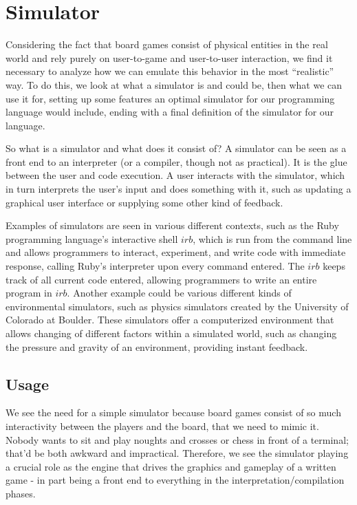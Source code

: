 \section{Simulator}
Considering the fact that board games consist of physical entities
in the real world and rely purely on user-to-game and user-to-user
interaction, we find it necessary to analyze how we can emulate this
behavior in the most ``realistic'' way. To do this, we look at what
a simulator is and could be, then what we can use it for, setting
up some features an optimal simulator for our programming language
would include, ending with a final definition of the simulator for our
language.

So what is a simulator and what does it consist of? A simulator can
be seen as a front end to an interpreter (or a compiler, though not
as practical). It is the glue between the user and code
execution. A user interacts with the simulator, which in turn interprets
the user's input and does something with it, such as updating a
graphical user interface or supplying some other kind of feedback.

Examples of simulators are seen in various different contexts, such
as the Ruby\cite{rubyLang} programming language's interactive shell
$irb$, which is run from the command line and allows programmers to
interact, experiment, and write code with immediate response, calling
Ruby's interpreter upon every command entered. The $irb$ keeps track
of all current code entered, allowing programmers to write an entire
program in $irb$. Another example could be various different kinds of
environmental simulators, such as physics simulators created by the
University of Colorado at Boulder\cite{colSim}. These simulators offer
a computerized environment that allows changing of different factors
within a simulated world, such as changing the pressure and gravity of
an environment, providing instant feedback.

\subsection{Usage}
We see the need for a simple simulator because board games consist of so
much interactivity between the players and the board, that we need to
mimic it. Nobody wants to sit and play noughts and crosses or chess in
front of a terminal; that'd be both awkward and impractical. Therefore,
we see the simulator playing a crucial role as the engine that drives
the graphics and gameplay of a written game - in part being a front end
to everything in the interpretation/compilation phases.

